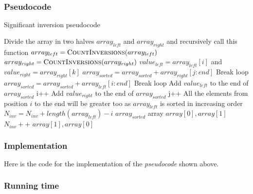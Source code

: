\documentclass{article}
\begin{document}
\subsubsection*{Pseudocode}

\begin{algorithm}[H]
\caption{Significant inversion pseudocode}
\begin{algorithmic}[1]
  \State Divide the array in two halves $array_{left}$ and $array_{right}$ and
  \State recursively call this function
  \State $array_{left} = \Call{CountInversions}{array_{left}}$
  \State $array_{right} = \Call{CountInversions}{array_{right}}$
   \State $value_{left}  = array_{left}[i]$ and $value_{right} = array_{right}[k]$
    \State $array_{sorted} = array_{sorted} + array_{right}[j:end]$
    \State Break loop
    \State $array_{sorted} = array_{sorted} + array_{left}[i:end]$
    \State Break loop
   \EndIf
    \State Add $value_{left}$ to the end of $array_{sorted}$
    \State i++
   \Else
    \State Add $value_{right}$ to the end of $array_{sorted}$
    \State j++
     \State All the elements from position $i$ to the end will be greater
     \State too as $array_{left}$ is sorted in increasing order
     \State $N_{inv} = N_{inv} + length(array_{left}) - i$
    \EndIf
   \EndIf
  \EndWhile
  \State \Return $array_{sorted}$
 \EndIf
  \State \Return array
 \ElsIf
   \State \Return $array[0],array[1]$
  \Else
    \State $N_{inv}++$
   \EndIf
   \State \Return $array[1],array[0]$
  \EndIf
 \EndIf
\EndFunction
\end{algorithmic}
\end{algorithm}

\subsubsection*{Implementation}

Here is the code for the implementation of the \textit{pseudocode} shown above.



\subsubsection*{Running time}
\end{document}
